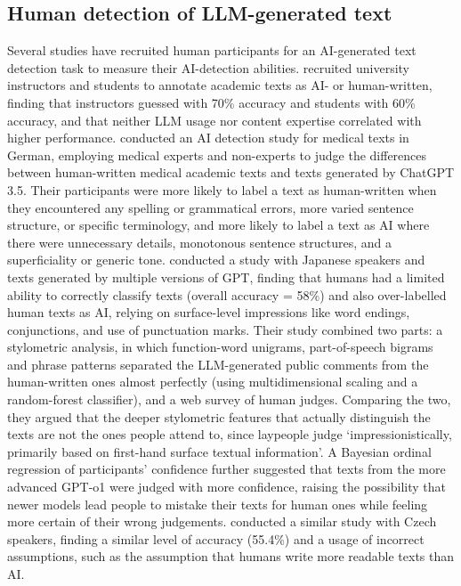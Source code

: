 \documentclass[thesis]{cluu}
\begin{document}
\subsection{Human detection of LLM-generated text}
Several studies have recruited human participants for an AI-generated text detection task to measure their AI-detection abilities. \textcite{waltzer2024spot} recruited university instructors and students to annotate academic texts as AI- or human-written, finding that instructors guessed with 70\% accuracy and students with 60\% accuracy, and that neither LLM usage nor content expertise correlated with higher performance. \textcite{doruetal} conducted an AI detection study for medical texts in German, employing medical experts and non-experts to judge the differences between human-written medical academic texts and texts generated by ChatGPT 3.5. Their participants were more likely to label a text as human-written when they encountered any spelling or grammatical errors, more varied sentence structure, or specific terminology, and more likely to label a text as AI where there were unnecessary details, monotonous sentence structures, and a superficiality or generic tone. \textcite{zaitsu2025stylometry} conducted a study with Japanese speakers and texts generated by multiple versions of GPT, finding that humans had a limited ability to correctly classify texts (overall accuracy = 58\%) and also over-labelled human texts as AI, relying on surface-level impressions like word endings, conjunctions, and use of punctuation marks. Their study combined two parts: a stylometric analysis, in which function-word unigrams, part-of-speech bigrams and phrase patterns separated the LLM-generated public comments from the human-written ones almost perfectly (using multidimensional scaling and a random-forest classifier), and a web survey of human judges. Comparing the two, they argued that the deeper stylometric features that actually distinguish the texts are not the ones people attend to, since laypeople judge `impressionistically, primarily based on first-hand surface textual information'. A Bayesian ordinal regression of participants' confidence further suggested that texts from the more advanced GPT-o1 were judged with more confidence, raising the possibility that newer models lead people to mistake their texts for human ones while feeling more certain of their wrong judgements.
 \textcite{milicka2025learning} conducted a similar study with Czech speakers, finding a similar level of accuracy (55.4\%) and a usage of incorrect assumptions, such as the assumption that humans write more readable texts than AI. 
\end{document}
